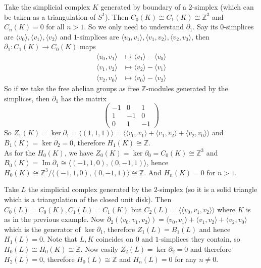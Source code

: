 \begin{example}
    Take the simplicial complex $K$ generated by boundary of a $2$-simplex (which can be taken as a triangulation of $S^1$).
    Then $C_0(K)\cong C_1(K)\cong\mathbb Z^3$ and $C_n(K)=0$ for all $n>1$.
    So we only need to understand $\partial_1$.
    Say its $0$-simplices are $\langle v_0\rangle,\langle v_1\rangle,\langle v_2\rangle$ and $1$-simplices are $\langle v_0,v_1\rangle,\langle v_1,v_2\rangle,\langle v_2,v_0\rangle$, then $\partial_1:C_1(K)\to C_0(K)$ maps
    \begin{align*}
        \langle v_0,v_1\rangle &\mapsto \langle v_1\rangle-\langle v_0\rangle\\
        \langle v_1,v_2\rangle &\mapsto \langle v_2\rangle-\langle v_1\rangle\\
        \langle v_2,v_0\rangle &\mapsto \langle v_0\rangle-\langle v_2\rangle
    \end{align*}
    So if we take the free abelian groups as free $\mathbb Z$-modules generated by the simplices, then $\partial_1$ has the matrix
    $$\begin{pmatrix}
        -1&0&1\\
        1&-1&0\\
        0&1&-1
    \end{pmatrix}$$
    So $Z_1(K)=\ker\partial_1=\langle(1,1,1)\rangle=\langle \langle v_0,v_1\rangle +\langle v_1,v_2\rangle + \langle v_2,v_0\rangle\rangle$ and $B_1(K)=\ker\partial_2=0$, therefore $H_1(K)\cong\mathbb Z$.\\
    As for the $H_0(K)$, we have $Z_0(K)=\ker\partial_0=C_0(K)\cong\mathbb Z^3$ and $B_0(K)=\operatorname{Im}\partial_1\cong\langle (-1,1,0),(0,-1,1)\rangle$, hence $H_0(K)\cong\mathbb Z^3/\langle (-1,1,0),(0,-1,1)\rangle\cong\mathbb Z$.
    And $H_n(K)=0$ for $n>1$.
\end{example}
\begin{example}
    Take $L$ the simplicial complex generated by the $2$-simplex (so it is a solid triangle which is a triangulation of the closed unit disk).
    Then $C_0(L)=C_0(K),C_1(L)=C_1(K)$ but $C_2(L)=\langle\langle v_0,v_1,v_2\rangle\rangle$ where $K$ is as in the previous example.
    Now $\partial_2(\langle v_0,v_1,v_2\rangle)=\langle v_0,v_1\rangle+\langle v_1,v_2\rangle+\langle v_2,v_0\rangle$ which is the generator of $\ker\partial_1$, therefore $Z_1(L)=B_1(L)$ and hence $H_1(L)=0$.
    Note that $L,K$ coincides on $0$ and $1$-simplices they contain, so $H_0(L)\cong H_0(K)\cong\mathbb Z$.
    Now easily $Z_2(L)=\ker\partial_2=0$ and therefore $H_2(L)=0$, therefore $H_0(L)\cong\mathbb Z$ and $H_n(L)=0$ for any $n\neq 0$.
\end{example}
